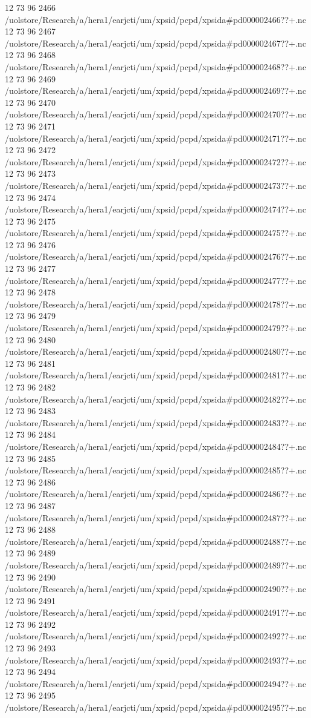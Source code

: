 12 73 96
2466
/uolstore/Research/a/hera1/earjcti/um/xpsid/pcpd/xpsida#pd000002466??+.nc
12 73 96
2467
/uolstore/Research/a/hera1/earjcti/um/xpsid/pcpd/xpsida#pd000002467??+.nc
12 73 96
2468
/uolstore/Research/a/hera1/earjcti/um/xpsid/pcpd/xpsida#pd000002468??+.nc
12 73 96
2469
/uolstore/Research/a/hera1/earjcti/um/xpsid/pcpd/xpsida#pd000002469??+.nc
12 73 96
2470
/uolstore/Research/a/hera1/earjcti/um/xpsid/pcpd/xpsida#pd000002470??+.nc
12 73 96
2471
/uolstore/Research/a/hera1/earjcti/um/xpsid/pcpd/xpsida#pd000002471??+.nc
12 73 96
2472
/uolstore/Research/a/hera1/earjcti/um/xpsid/pcpd/xpsida#pd000002472??+.nc
12 73 96
2473
/uolstore/Research/a/hera1/earjcti/um/xpsid/pcpd/xpsida#pd000002473??+.nc
12 73 96
2474
/uolstore/Research/a/hera1/earjcti/um/xpsid/pcpd/xpsida#pd000002474??+.nc
12 73 96
2475
/uolstore/Research/a/hera1/earjcti/um/xpsid/pcpd/xpsida#pd000002475??+.nc
12 73 96
2476
/uolstore/Research/a/hera1/earjcti/um/xpsid/pcpd/xpsida#pd000002476??+.nc
12 73 96
2477
/uolstore/Research/a/hera1/earjcti/um/xpsid/pcpd/xpsida#pd000002477??+.nc
12 73 96
2478
/uolstore/Research/a/hera1/earjcti/um/xpsid/pcpd/xpsida#pd000002478??+.nc
12 73 96
2479
/uolstore/Research/a/hera1/earjcti/um/xpsid/pcpd/xpsida#pd000002479??+.nc
12 73 96
2480
/uolstore/Research/a/hera1/earjcti/um/xpsid/pcpd/xpsida#pd000002480??+.nc
12 73 96
2481
/uolstore/Research/a/hera1/earjcti/um/xpsid/pcpd/xpsida#pd000002481??+.nc
12 73 96
2482
/uolstore/Research/a/hera1/earjcti/um/xpsid/pcpd/xpsida#pd000002482??+.nc
12 73 96
2483
/uolstore/Research/a/hera1/earjcti/um/xpsid/pcpd/xpsida#pd000002483??+.nc
12 73 96
2484
/uolstore/Research/a/hera1/earjcti/um/xpsid/pcpd/xpsida#pd000002484??+.nc
12 73 96
2485
/uolstore/Research/a/hera1/earjcti/um/xpsid/pcpd/xpsida#pd000002485??+.nc
12 73 96
2486
/uolstore/Research/a/hera1/earjcti/um/xpsid/pcpd/xpsida#pd000002486??+.nc
12 73 96
2487
/uolstore/Research/a/hera1/earjcti/um/xpsid/pcpd/xpsida#pd000002487??+.nc
12 73 96
2488
/uolstore/Research/a/hera1/earjcti/um/xpsid/pcpd/xpsida#pd000002488??+.nc
12 73 96
2489
/uolstore/Research/a/hera1/earjcti/um/xpsid/pcpd/xpsida#pd000002489??+.nc
12 73 96
2490
/uolstore/Research/a/hera1/earjcti/um/xpsid/pcpd/xpsida#pd000002490??+.nc
12 73 96
2491
/uolstore/Research/a/hera1/earjcti/um/xpsid/pcpd/xpsida#pd000002491??+.nc
12 73 96
2492
/uolstore/Research/a/hera1/earjcti/um/xpsid/pcpd/xpsida#pd000002492??+.nc
12 73 96
2493
/uolstore/Research/a/hera1/earjcti/um/xpsid/pcpd/xpsida#pd000002493??+.nc
12 73 96
2494
/uolstore/Research/a/hera1/earjcti/um/xpsid/pcpd/xpsida#pd000002494??+.nc
12 73 96
2495
/uolstore/Research/a/hera1/earjcti/um/xpsid/pcpd/xpsida#pd000002495??+.nc
